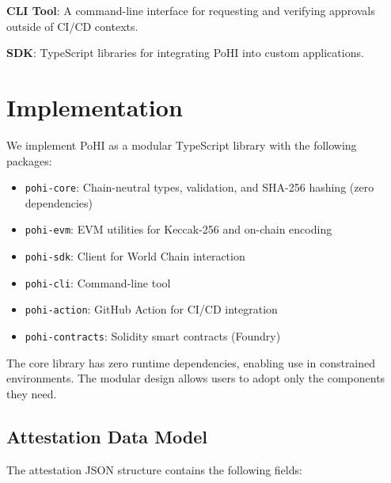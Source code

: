 \documentclass[conference]{IEEEtran}
\begin{document}
\textbf{CLI Tool}: A command-line interface for requesting and verifying approvals outside of CI/CD contexts.

\textbf{SDK}: TypeScript libraries for integrating PoHI into custom applications.

\section{Implementation}

We implement PoHI as a modular TypeScript library with the following packages:

\begin{itemize}
    \item \texttt{pohi-core}: Chain-neutral types, validation, and SHA-256 hashing (zero dependencies)
    \item \texttt{pohi-evm}: EVM utilities for Keccak-256 and on-chain encoding
    \item \texttt{pohi-sdk}: Client for World Chain interaction
    \item \texttt{pohi-cli}: Command-line tool
    \item \texttt{pohi-action}: GitHub Action for CI/CD integration
    \item \texttt{pohi-contracts}: Solidity smart contracts (Foundry)
\end{itemize}

The core library has zero runtime dependencies, enabling use in constrained environments. The modular design allows users to adopt only the components they need.

\subsection{Attestation Data Model}

The attestation JSON structure contains the following fields:
\end{document}
